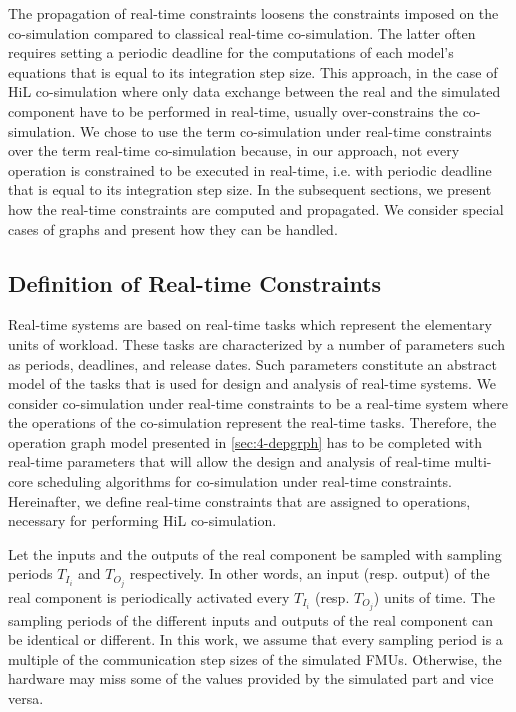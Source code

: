 The propagation of real-time constraints loosens the constraints imposed on the co-simulation compared to classical real-time co-simulation. The latter often requires setting a periodic deadline for the computations of each model's equations that is equal to its integration step size. This approach, in the case of HiL co-simulation where only data exchange between the real and the simulated component have to be performed in real-time, usually over-constrains the co-simulation. We chose to use the term co-simulation under real-time constraints over the term real-time co-simulation because, in our approach, not every operation is constrained to be executed in real-time, i.e. with periodic deadline that is equal to its integration step size. In the subsequent sections, we present how the real-time constraints are computed and propagated. We consider special cases of graphs and present how they can be handled.

\subsection{Definition of Real-time Constraints}

Real-time systems are based on real-time tasks which represent the elementary units of workload. These tasks are characterized by a number of parameters such as periods, deadlines, and release dates. Such parameters constitute an abstract model of the tasks that is used for design and analysis of real-time systems. We consider co-simulation under real-time constraints to be a real-time system where the operations of the co-simulation represent the real-time tasks. Therefore, the operation graph model presented in \ref{sec:4-depgrph} has to be completed with real-time parameters that will allow the design and analysis of real-time multi-core scheduling algorithms for co-simulation under real-time constraints. Hereinafter, we define real-time constraints that are assigned to operations, necessary for performing HiL co-simulation.

Let the inputs and the outputs of the real component be sampled with sampling periods $T_{I_i}$ and $T_{O_j}$ respectively. In other words, an input (resp. output) of the real component is periodically activated every $T_{I_i}$ (resp. $T_{O_j}$) units of time. The sampling periods of the different inputs and outputs of the real component can be identical or different. In this work, we assume that every sampling period is a multiple of the communication step sizes of the simulated FMUs. Otherwise, the hardware may miss some of the values provided by the simulated part and vice versa. 


